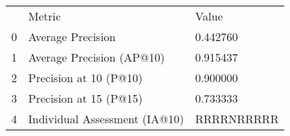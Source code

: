 \begin{tabular}{lll}
 & Metric & Value \\
0 & Average Precision & 0.442760 \\
1 & Average Precision (AP@10) & 0.915437 \\
2 & Precision at 10 (P@10) & 0.900000 \\
3 & Precision at 15 (P@15) & 0.733333 \\
4 & Individual Assessment (IA@10) & RRRRNRRRRR \\
\end{tabular}
